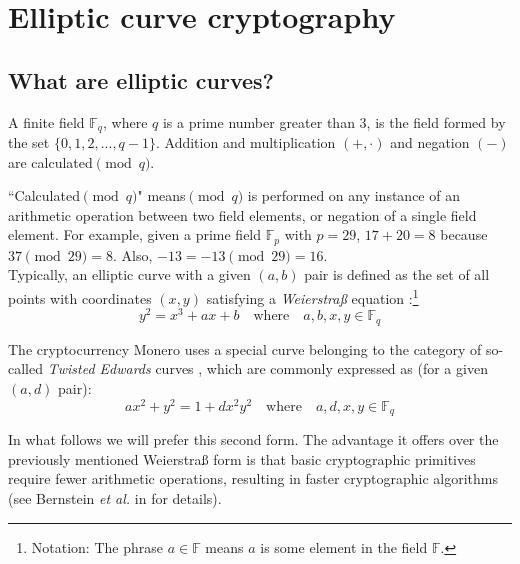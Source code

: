 \section{Elliptic curve cryptography}
\label{EllipticCurveCryptography}


\subsection{What are elliptic curves?}
\label{elliptic_curves_section}

A finite field \(\mathbb{F}_q\), where \(q\) is a prime number greater than 3, is the field formed by the set \(\{0, 1, 2, ..., q-1\}\). Addition and multiplication \((+,  \cdot)\) and negation $(-)$ are calculated\( \pmod q\).

``Calculated\( \pmod q\)" means\( \pmod q\) is performed on any instance of an arithmetic operation between two field elements, or negation of a single field element. For example, given a prime field \(\mathbb{F}_p\) with $p = 29$, $17+20=8$ because $37 \pmod{29} = 8$. Also, $-13 = -13 \pmod{29} = 16$.\\

Typically, an elliptic curve with a given $(a,b)$ pair is defined as the set of all points with coordinates \((x, y)\) satisfying a {\em Weierstraß} equation \cite{Hankerson:2003:GEC:940321}:\footnote{\label{notation1}Notation: The phrase $a \in \mathbb{F}$ means $a$ is some element in the field $\mathbb{F}$.}\vspace{.175cm}
\[y^2 = x^3 + a x + b \quad \textrm{where} \quad a, b, x, y \in \mathbb{F}_q\]

The cryptocurrency Monero uses a special curve belonging to the category of so-called {\em Twisted Edwards} curves \cite{Bernstein2008}, which are commonly expressed as (for a given $(a,d)$ pair):\vspace{.175cm}
\[a x^2 + y^2 = 1 + d x^2 y^2 \quad \textrm{where} \quad a, d, x, y \in \mathbb{F}_q \]


In what follows we will prefer this second form. The advantage it offers over the previously mentioned Weierstraß form is that basic cryptographic primitives require fewer arithmetic operations, resulting in faster cryptographic algorithms (see Bernstein {\em et al.} in \cite{Bernstein2007} for details).\\

